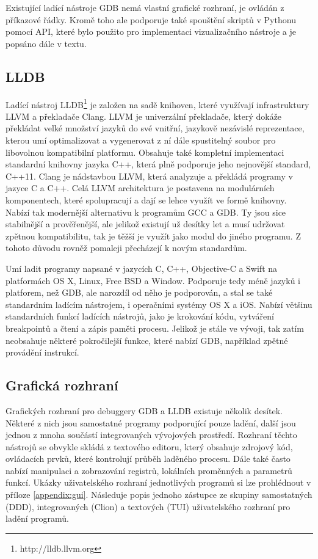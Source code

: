 \documentclass[bc,male,python,dept460]{diploma}						%
\newcommand{\parspace}[1][]{
	\ifthenelse{\isempty{#1}}{\vspace{5mm}}{\vspace{#1}}
	\par
}
\begin{document}
\begin{section}{Existující ladící nástroje}
		GDB nemá vlastní grafické rozhraní, je ovládán z příkazové řádky. Kromě toho ale podporuje také spouštění skriptů v Pythonu pomocí API,
		které bylo použito pro implementaci vizualizačního nástroje a je popsáno dále v textu.
	\subsection{LLDB}
		Ladící nástroj LLDB\footnote{http://lldb.llvm.org} je založen na sadě knihoven, které využívají infrastruktury LLVM a překladače Clang.
		LLVM je univerzální překladače, který dokáže překládat velké množství jazyků do své vnitřní, jazykově nezávislé reprezentace, kterou umí
		optimalizovat a vygenerovat z ní dále spustitelný soubor pro libovolnou kompatibilní platformu. Obsahuje také kompletní implementaci standardní
		knihovny jazyka C++, která plně podporuje jeho nejnovější standard, C++11. Clang je nádstavbou LLVM, která analyzuje a překládá programy v jazyce
		C a C++. Celá LLVM architektura je postavena na modulárních komponentech, které spolupracují a dají se lehce využít ve formě knihovny.
		Nabízí tak modernější alternativu k programům GCC a GDB. Ty jsou sice stabilnější a prověřenější, ale jelikož existují už desítky let a musí udržovat
		zpětnou kompatibilitu, tak je těžší je využít jako modul do jiného programu. Z tohoto důvodu rovněž pomaleji přecházejí k novým standardům.
		
		\parspace Umí ladit programy napsané v jazycích C, C++, Objective-C a Swift na platformách OS X, Linux, Free BSD a Window. Podporuje tedy méně jazyků
		i platforem, než GDB, ale narozdíl od něho je podporován, a stal se také standardním ladícím nástrojem, i operačními systémy OS X a iOS.
		Nabízí většinu standardních funkcí ladících nástrojů, jako je krokování kódu, vytváření breakpointů a čtení a zápis paměti procesu.
		Jelikož je stále ve vývoji, tak zatím neobsahuje některé pokročilejší funkce, které nabízí GDB, například zpětné provádění instrukcí.

	\subsection{Grafická rozhraní}
		Grafických rozhraní pro debuggery GDB a LLDB existuje několik desítek. Některé z nich jsou samostatné programy podporující pouze ladění, další jsou
		jednou z mnoha součástí integrovaných vývojových prostředí. Rozhraní těchto nástrojů se obvykle skládá z textového editoru, který obsahuje zdrojový kód,
		ovládacích prvků, které kontrolují průběh laděného procesu. Dále také často nabízí manipulaci a zobrazování registrů, lokálních proměnných a parametrů
		funkcí. Ukázky uživatelského rozhraní jednotlivých programů si lze prohlédnout v příloze \ref{appendix:gui}. Následuje popis jednoho zástupce
		ze skupiny samostatných (DDD), integrovaných (Clion) a textových (TUI) uživatelského rozhraní pro ladění programů.
	

\end{section}
\end{document}
